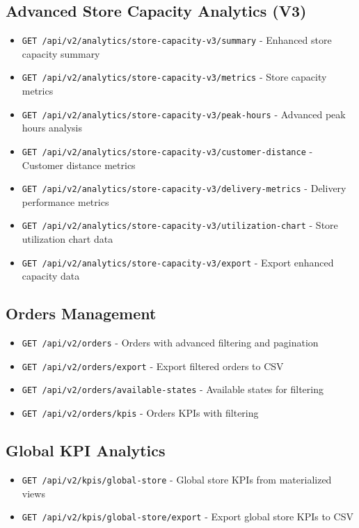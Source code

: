 \documentclass[11pt,a4paper]{article}
\begin{document}
\subsection{Advanced Store Capacity Analytics (V3)}
\begin{itemize}[leftmargin=*]
    \item \texttt{GET /api/v2/analytics/store-capacity-v3/summary} - Enhanced store capacity summary
    \item \texttt{GET /api/v2/analytics/store-capacity-v3/metrics} - Store capacity metrics
    \item \texttt{GET /api/v2/analytics/store-capacity-v3/peak-hours} - Advanced peak hours analysis
    \item \texttt{GET /api/v2/analytics/store-capacity-v3/customer-distance} - Customer distance metrics
    \item \texttt{GET /api/v2/analytics/store-capacity-v3/delivery-metrics} - Delivery performance metrics
    \item \texttt{GET /api/v2/analytics/store-capacity-v3/utilization-chart} - Store utilization chart data
    \item \texttt{GET /api/v2/analytics/store-capacity-v3/export} - Export enhanced capacity data
\end{itemize}

\subsection{Orders Management}
\begin{itemize}[leftmargin=*]
    \item \texttt{GET /api/v2/orders} - Orders with advanced filtering and pagination
    \item \texttt{GET /api/v2/orders/export} - Export filtered orders to CSV
    \item \texttt{GET /api/v2/orders/available-states} - Available states for filtering
    \item \texttt{GET /api/v2/orders/kpis} - Orders KPIs with filtering
\end{itemize}

\subsection{Global KPI Analytics}
\begin{itemize}[leftmargin=*]
    \item \texttt{GET /api/v2/kpis/global-store} - Global store KPIs from materialized views
    \item \texttt{GET /api/v2/kpis/global-store/export} - Export global store KPIs to CSV
\end{itemize}
\end{document}
